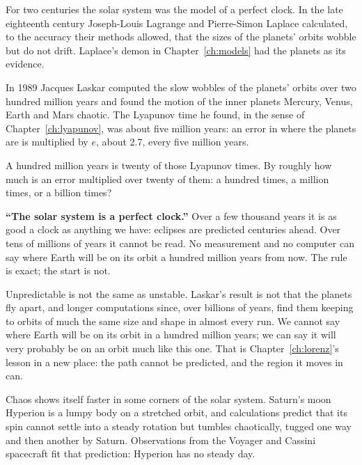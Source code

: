 \noindent
For two centuries the solar system was the model of a perfect clock. In the
late eighteenth century Joseph-Louis Lagrange and Pierre-Simon Laplace
calculated, to the accuracy their methods allowed, that the sizes of the
planets' orbits wobble but do not drift. Laplace's demon in
Chapter~\ref{ch:models} had the planets as its evidence.

In 1989 Jacques Laskar computed the slow wobbles of the planets' orbits over
two hundred million years and found the motion of the inner planets
\dash{} Mercury, Venus, Earth and Mars \dash{} chaotic. The Lyapunov time he
found, in the sense of Chapter~\ref{ch:lyapunov}, was about five million
years: an error in where the planets are is multiplied by $e$, about
\num{2.7}, every five million years.

\begin{think}
A hundred million years is twenty of those Lyapunov times. By roughly how
much is an error multiplied over twenty of them: a hundred times, a million
times, or a billion times?
\end{think}

\begin{trapbox}
\textbf{\enquote{The solar system is a perfect clock.}} Over a few thousand
years it is as good a clock as anything we have: eclipses are predicted
centuries ahead. Over tens of millions of years it cannot be read. No
measurement and no computer can say where Earth will be on its orbit a
hundred million years from now. The rule is exact; the start is not.
\end{trapbox}

\noindent
Unpredictable is not the same as unstable. Laskar's result is not that the
planets fly apart, and longer computations since, over billions of years,
find them keeping to orbits of much the same size and shape in almost every
run. We cannot say where Earth will be on its orbit in a hundred million
years; we can say it will very probably be on an orbit much like this one.
That is Chapter~\ref{ch:lorenz}'s lesson in a new place: the path cannot be
predicted, and the region it moves in can.

Chaos shows itself faster in some corners of the solar system. Saturn's moon
Hyperion is a lumpy body on a stretched orbit, and calculations predict that
its spin cannot settle into a steady rotation but tumbles chaotically, tugged
one way and then another by Saturn. Observations from the Voyager and
Cassini spacecraft fit that prediction: Hyperion has no steady day.

